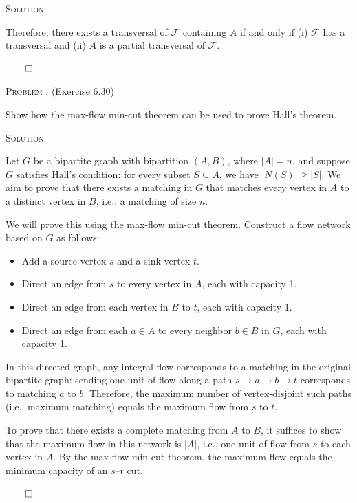 \documentclass[12pt, a4paper, oneside]{ctexart}
\newcounter{problemname}
\newenvironment{problem}{\begin{framed}\stepcounter{problemname}\par\noindent\textsc{Problem \arabic{problemname}. }}{\end{framed}\par}
\newenvironment{solution}{%
	\par\noindent\textsc{Solution. }\ignorespaces
}{%
	\hfill$\qed$\par
}
\begin{document}
\begin{solution}
		Therefore, there exists a transversal of \( \mathcal{F} \) containing \( A \) if and only if (i) \( \mathcal{F} \) has a transversal and (ii) \( A \) is a partial transversal of \( \mathcal{F} \). 
		
	\end{solution}
	
	\begin{problem}
		(Exercise 6.30)
		
		Show how the max-flow min-cut theorem can be used to prove Hall's theorem.
	\end{problem}
	
	\begin{solution}
		Let \( G \) be a bipartite graph with bipartition \( (A, B) \), where \( |A| = n \), and suppose \( G \) satisfies Hall's condition: for every subset \( S \subseteq A \), we have \( |N(S)| \geq |S| \). We aim to prove that there exists a matching in \( G \) that matches every vertex in \( A \) to a distinct vertex in \( B \), i.e., a matching of size \( n \).
		
		We will prove this using the max-flow min-cut theorem. Construct a flow network based on \( G \) as follows:
		
		\begin{itemize}
			\item Add a source vertex \( s \) and a sink vertex \( t \).
			\item Direct an edge from \( s \) to every vertex in \( A \), each with capacity 1.
			\item Direct an edge from each vertex in \( B \) to \( t \), each with capacity 1.
			\item Direct an edge from each \( a \in A \) to every neighbor \( b \in B \) in \( G \), each with capacity 1.
		\end{itemize}
		
		In this directed graph, any integral flow corresponds to a matching in the original bipartite graph: sending one unit of flow along a path \( s \to a \to b \to t \) corresponds to matching \( a \) to \( b \). Therefore, the maximum number of vertex-disjoint such paths (i.e., maximum matching) equals the maximum flow from \( s \) to \( t \).
		
		To prove that there exists a complete matching from \( A \) to \( B \), it suffices to show that the maximum flow in this network is \( |A| \), i.e., one unit of flow from \( s \) to each vertex in \( A \). By the max-flow min-cut theorem, the maximum flow equals the minimum capacity of an \( s \)--\( t \) cut.
		

\end{solution}
\end{document}
